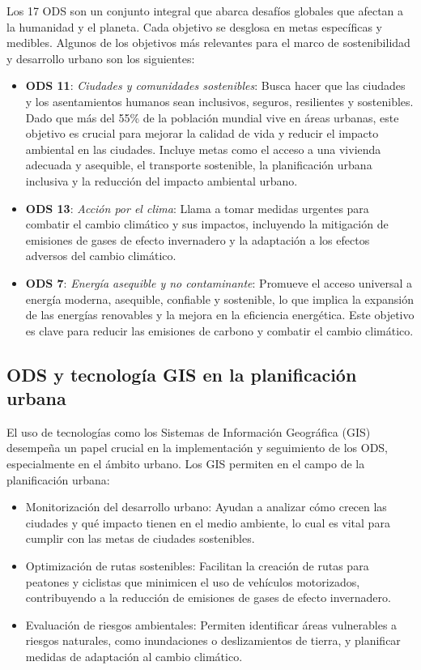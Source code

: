 	Los 17 ODS son un conjunto integral que abarca desafíos globales que afectan a la humanidad y el planeta. Cada objetivo se desglosa en metas específicas y medibles. Algunos de los objetivos más relevantes para el marco de sostenibilidad y desarrollo urbano son los siguientes:
	\begin{itemize}
		\item \textbf{ODS 11}: \textit{Ciudades y comunidades sostenibles}: Busca hacer que las ciudades y los asentamientos humanos sean inclusivos, seguros, resilientes y sostenibles. Dado que más del 55\% de la población mundial vive en áreas urbanas, este objetivo es crucial para mejorar la calidad de vida y reducir el impacto ambiental en las ciudades. Incluye metas como el acceso a una vivienda adecuada y asequible, el transporte sostenible, la planificación urbana inclusiva y la reducción del impacto ambiental urbano.
		
		\item \textbf{ODS 13}: \textit{Acción por el clima}: Llama a tomar medidas urgentes para combatir el cambio climático y sus impactos, incluyendo la mitigación de emisiones de gases de efecto invernadero y la adaptación a los efectos adversos del cambio climático.
		
		\item \textbf{ODS 7}: \textit{Energía asequible y no contaminante}: Promueve el acceso universal a energía moderna, asequible, confiable y sostenible, lo que implica la expansión de las energías renovables y la mejora en la eficiencia energética. Este objetivo es clave para reducir las emisiones de carbono y combatir el cambio climático.
		
	\end{itemize}
	
	\subsection{ODS y tecnología GIS en la planificación urbana}
	El uso de tecnologías como los Sistemas de Información Geográfica (GIS) desempeña un papel crucial en la implementación y seguimiento de los ODS, especialmente en el ámbito urbano. Los GIS permiten en el campo de la planificación urbana:
	\begin{itemize}
		\item Monitorización del desarrollo urbano: Ayudan a analizar cómo crecen las ciudades y qué impacto tienen en el medio ambiente, lo cual es vital para cumplir con las metas de ciudades sostenibles.
		
		\item Optimización de rutas sostenibles: Facilitan la creación de rutas para peatones y ciclistas que minimicen el uso de vehículos motorizados, contribuyendo a la reducción de emisiones de gases de efecto invernadero.
		
		\item Evaluación de riesgos ambientales: Permiten identificar áreas vulnerables a riesgos naturales, como inundaciones o deslizamientos de tierra, y planificar medidas de adaptación al cambio climático.
	\end{itemize}
	

